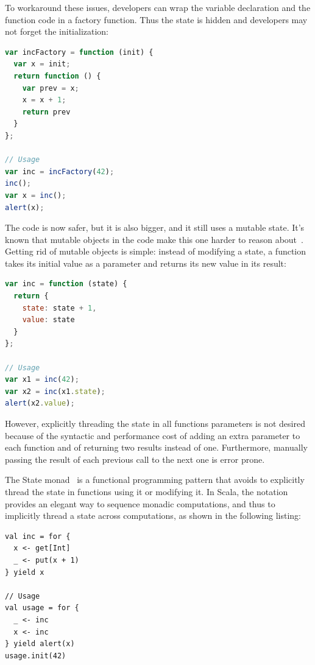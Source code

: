 \documentclass[american,english,runningheads]{llncs}
\begin{document}
To workaround these issues, developers can wrap the variable declaration and the  function code in a factory function. Thus the state is hidden and developers may not forget the initialization:

\begin{lstlisting}[language=JavaScript,label=state-encapsulated,caption=State encapsulation within a function]
var incFactory = function (init) {
  var x = init;
  return function () {
    var prev = x;
    x = x + 1;
    return prev
  }
};

// Usage
var inc = incFactory(42);
inc();
var x = inc();
alert(x);
\end{lstlisting}

The code is now safer, but it is also bigger, and it still uses a mutable state. It’s known that mutable objects in the code make this one harder to reason about~\cite{Grogono94_Immutability,Kjolstad11_Immutability}. Getting rid of mutable objects is simple: instead of modifying a state, a function takes its initial value as a parameter and returns its new value in its result:

\begin{lstlisting}[language=JavaScript,label=state-explicit,caption=Explicit state threading]
var inc = function (state) {
  return {
    state: state + 1,
    value: state
  }
};

// Usage
var x1 = inc(42);
var x2 = inc(x1.state);
alert(x2.value);
\end{lstlisting}

However, explicitly threading the state in all functions parameters is not desired because of the syntactic and performance cost of adding an extra parameter to each function and of returning two results instead of one. Furthermore, manually passing the result of each previous call to the next one is error prone.

The State monad~\cite{Wadler92_StateM} is a functional programming pattern that avoids to explicitly thread the state in functions using it or modifying it. In Scala, the  notation provides an elegant way to sequence monadic computations, and thus to implicitly thread a state across computations, as shown in the following listing:

\begin{lstlisting}[label=state-monad,caption=Implicitly threaded state using the State Monad]
val inc = for {
  x <- get[Int]
  _ <- put(x + 1)
} yield x

// Usage
val usage = for {
  _ <- inc
  x <- inc
} yield alert(x)
usage.init(42)
\end{lstlisting}
\end{document}
